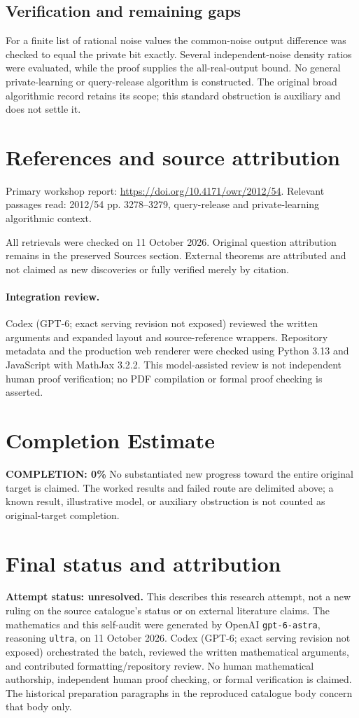 \documentclass[11pt]{article}
\begin{document}
\subsection{Verification and remaining gaps}
For a finite list of rational noise values the common-noise output difference was checked to equal the private bit exactly. Several independent-noise density ratios were evaluated, while the proof supplies the all-real-output bound. No general private-learning or query-release algorithm is constructed. The original broad algorithmic record retains its scope; this standard obstruction is auxiliary and does not settle it.

\section{References and source attribution}
Primary workshop report: \url{https://doi.org/10.4171/owr/2012/54}. Relevant passages read: 2012/54 pp. 3278--3279, query-release and private-learning algorithmic context.

All retrievals were checked on 11 October 2026. Original question attribution remains in the preserved Sources section. External theorems are attributed and not claimed as new discoveries or fully verified merely by citation.


\paragraph{Integration review.} Codex (GPT-6; exact serving revision not exposed) reviewed the written arguments and expanded layout and source-reference wrappers. Repository metadata and the production web renderer were checked using Python 3.13 and JavaScript with MathJax 3.2.2. This model-assisted review is not independent human proof verification; no PDF compilation or formal proof checking is asserted.

\section{Completion Estimate}
\noindent\textbf{COMPLETION: 0\%}
No substantiated new progress toward the entire original target is claimed. The worked results and failed route are delimited above; a known result, illustrative model, or auxiliary obstruction is not counted as original-target completion.

\section{Final status and attribution}
\textbf{Attempt status: unresolved.} This describes this research attempt, not a new ruling on the source catalogue's status or on external literature claims.
The mathematics and this self-audit were generated by OpenAI \texttt{gpt-6-astra}, reasoning \texttt{ultra}, on 11 October 2026. Codex (GPT-6; exact serving revision not exposed) orchestrated the batch, reviewed the written mathematical arguments, and contributed formatting/repository review. No human mathematical authorship, independent human proof checking, or formal verification is claimed. The historical preparation paragraphs in the reproduced catalogue body concern that body only.
\end{document}
